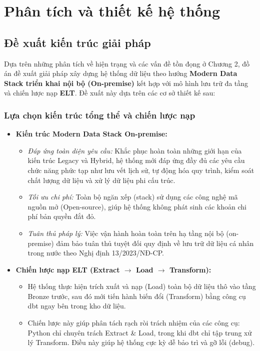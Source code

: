 \chapter{Phân tích và thiết kế hệ thống}
\label{ch:analysis-design}

\section{Đề xuất kiến trúc giải pháp}
\label{sec:solution-arch}

Dựa trên những phân tích về hiện trạng và các vấn đề tồn đọng ở Chương 2, đồ án đề xuất giải pháp xây dựng hệ thống dữ liệu theo hướng \textbf{Modern Data Stack triển khai nội bộ (On-premise)} kết hợp với mô hình lưu trữ đa tầng và chiến lược nạp \textbf{ELT}. Đề xuất này dựa trên các cơ sở thiết kế sau:

\subsection{Lựa chọn kiến trúc tổng thể và chiến lược nạp}

\begin{itemize}
    \item \textbf{Kiến trúc Modern Data Stack On-premise:}
    \begin{itemize}
        \item \textit{Đáp ứng toàn diện yêu cầu:} Khắc phục hoàn toàn những giới hạn của kiến trúc Legacy và Hybrid, hệ thống mới đáp ứng đầy đủ các yêu cầu chức năng phức tạp như lưu vết lịch sử, tự động hóa quy trình, kiểm soát chất lượng dữ liệu và xử lý dữ liệu phi cấu trúc.
        \item \textit{Tối ưu chi phí:} Toàn bộ ngăn xếp (stack) sử dụng các công nghệ mã nguồn mở (Open-source), giúp hệ thống không phát sinh các khoản chi phí bản quyền đắt đỏ.
        \item \textit{Tuân thủ pháp lý:} Việc vận hành hoàn toàn trên hạ tầng nội bộ (on-premise) đảm bảo tuân thủ tuyệt đối quy định về lưu trữ dữ liệu cá nhân trong nước theo Nghị định 13/2023/NĐ-CP.
    \end{itemize}

    \item \textbf{Chiến lược nạp ELT (Extract $\rightarrow$ Load $\rightarrow$ Transform):}
    \begin{itemize}
        \item Hệ thống thực hiện trích xuất và nạp (Load) toàn bộ dữ liệu thô vào tầng Bronze trước, sau đó mới tiến hành biến đổi (Transform) bằng công cụ dbt ngay bên trong kho dữ liệu.
        \item Chiến lược này giúp phân tách rạch ròi trách nhiệm của các công cụ: Python chỉ chuyên trách Extract \& Load, trong khi dbt chỉ tập trung xử lý Transform. Điều này giúp hệ thống cực kỳ dễ bảo trì và gỡ lỗi (debug).
    \end{itemize}
\end{itemize}


